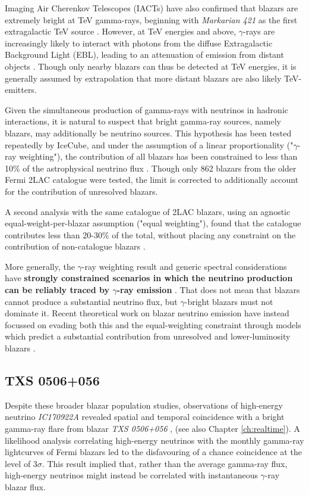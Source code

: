 Imaging Air Cherenkov Telescopes (IACTs) have also confirmed that blazars are extremely bright at TeV gamma-rays, beginning with \emph{Markarian 421} as the first extragalactic TeV source . However, at TeV energies and above, $\gamma$-rays are increasingly likely to interact with photons from the diffuse Extragalactic Background Light (EBL), leading to an attenuation of emission from distant objects . Though only nearby blazars can thus be detected at TeV energies, it is generally assumed by extrapolation that more distant blazars are also likely TeV-emitters.

Given the simultaneous production of gamma-rays with neutrinos in hadronic interactions, it is natural to suspect that bright gamma-ray sources, namely blazars, may additionally be neutrino sources. This hypothesis has been tested repeatedly by IceCube, and under the assumption of a linear proportionality ("$\gamma$-ray weighting"), the contribution of all blazars has been constrained to less than 10\% of the astrophysical neutrino flux . Though only 862 blazars from the older Fermi 2LAC catalogue were tested, the limit is corrected to additionally account for the contribution of unresolved blazars. 

A second analysis with the same catalogue of 2LAC blazars, using an agnostic equal-weight-per-blazar assumption ("equal weighting"), found that the catalogue contributes less than 20-30\% of the total, without placing any constraint on the contribution of non-catalogue blazars \cite{ic_blazar_17}. 

More generally, the $\gamma$-ray weighting result and generic spectral considerations have \textbf{strongly constrained scenarios in which the neutrino production can be reliably traced by $\gamma$-ray emission} . That does not mean that blazars cannot produce a substantial neutrino flux, but $\gamma$-bright blazars must not dominate it. Recent theoretical work on blazar neutrino emission have instead focussed on evading both this and the equal-weighting constraint through models which predict a substantial contribution from unresolved and lower-luminosity blazars .

\subsection*{TXS 0506+056}
\label{subsec:txs}

Despite these broader blazar population studies, observations of high-energy neutrino \emph{IC170922A} revealed spatial and temporal coincidence with a bright gamma-ray flare from blazar \emph{TXS 0506+056} , (see also Chapter \ref{ch:realtime}). A likelihood analysis correlating high-energy neutrinos with the monthly gamma-ray lightcurves of Fermi blazars led to the disfavouring of a chance coincidence at the level of $3 \sigma$. This result implied that, rather than the average gamma-ray flux, high-energy neutrinos might instead be correlated with instantaneous $\gamma$-ray blazar flux. 

